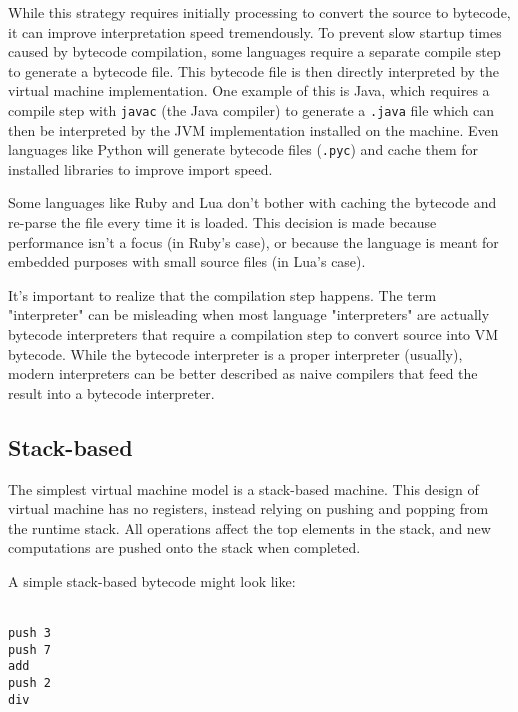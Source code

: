\documentclass{book}
\newcommand{\Scribtexttt}[1]{{\texttt{#1}}}
\newcommand{\Ssubsubsection}[2]{\subsubsection[#1]{#2}}
\renewcommand{\Ssubsubsection}[2]{\subsection[#1]{#2}}
\begin{document}
While this strategy requires initially processing to convert the
source to bytecode, it can improve interpretation speed tremendously. To
prevent slow startup times caused by bytecode compilation, some languages
require a separate compile step to generate a bytecode file. This bytecode
file is then directly interpreted by the virtual machine implementation.
One example of this is Java, which requires a compile step with \Scribtexttt{javac}
(the Java compiler) to generate a \Scribtexttt{{\hbox{\texttt{.}}}java} file which can then be
interpreted by the JVM implementation installed on the machine. Even
languages like Python will generate bytecode files (\Scribtexttt{{\hbox{\texttt{.}}}pyc}) and cache
them for installed libraries to improve import speed.

Some languages like Ruby and Lua don{'}t bother with caching the bytecode
and re{-}parse the file every time it is loaded. This decision is made
because performance isn{'}t a focus (in Ruby{'}s case), or because the
language is meant for embedded purposes with small source files (in Lua{'}s
case).

It{'}s important to realize that the compilation step happens. The term
"interpreter" can be misleading when most language "interpreters" are
actually bytecode interpreters that require a compilation step to convert
source into VM bytecode. While the bytecode interpreter is a proper
interpreter (usually), modern interpreters can be better described as
naive compilers that feed the result into a bytecode interpreter.

\Ssubsubsection{Stack{-}based}{Stack{-}based}\label{t:x28part_x22Stackx2dbasedx22x29}

The simplest virtual machine model is a stack{-}based machine. This
design of virtual machine has no registers, instead relying on pushing and
popping from the runtime stack. All operations affect the top elements in
the stack, and new computations are pushed onto the stack when completed.

A simple stack{-}based bytecode might look like:

\hspace*{\fill}\\\Scribtexttt{push 3}\hspace*{\fill}\\\Scribtexttt{push 7}\hspace*{\fill}\\\Scribtexttt{add}\hspace*{\fill}\\\Scribtexttt{push 2}\hspace*{\fill}\\\Scribtexttt{div}\hspace*{\fill}\\
\end{document}
